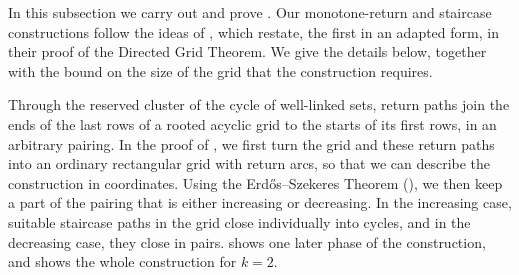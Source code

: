 \documentclass[fontsize=12pt,leading=14pt]{fullpaper}
\newcounter{step}
\begin{document}
In this subsection we carry out  and prove .
Our monotone-return and staircase constructions follow the ideas of \textcite[(3.3) and~(4.7)]{ReedRST96}, which \textcite[lemmas~6.3 and~5.5]{KawarabayashiK15} restate, the first in an adapted form, in their proof of the Directed Grid Theorem.
We give the details below, together with the bound on the size of the grid that the construction requires.

Through the reserved cluster of the cycle of well-linked sets, return paths join the ends of the last rows of a rooted acyclic grid to the starts of its first rows, in an arbitrary pairing.
In the proof of , we first turn the grid and these return paths into an ordinary rectangular grid with return arcs, so that we can describe the construction in coordinates.
Using the Erd\H{o}s--Szekeres Theorem (), we then keep a part of the pairing that is either increasing or decreasing.
In the increasing case, suitable staircase paths in the grid close individually into cycles, and in the decreasing case, they close in pairs.
 shows one later phase of the construction, and  shows the whole construction for $k=2$.
\end{document}
